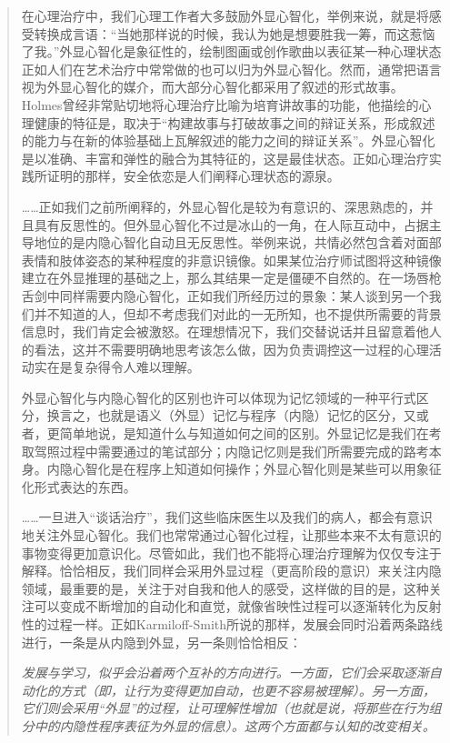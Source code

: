 \blockquote{
在心理治疗中，我们心理工作者大多鼓励外显心智化，举例来说，就是将感受转换成言语：“当她那样说的时候，我认为她是想要胜我一筹，而这惹恼了我。”外显心智化是象征性的，绘制图画或创作歌曲以表征某一种心理状态\pozhehao{}正如人们在艺术治疗中常常做的\pozhehao{}也可以归为外显心智化。然而，通常把语言视为外显心智化的媒介，而大部分心智化都采用了叙述的形式\pozhehao{}故事。Holmes曾经非常贴切地将心理治疗比喻为培育讲故事的功能，他描绘的心理健康的特征是，取决于“构建故事与打破故事之间的辩证关系，形成叙述的能力与在新的体验基础上瓦解叙述的能力之间的辩证关系”。外显心智化是以准确、丰富和弹性的融合为其特征的，这是最佳状态。正如心理治疗实践所证明的那样，安全依恋是人们阐释心理状态的源泉。

……正如我们之前所阐释的，外显心智化是较为有意识的、深思熟虑的，并且具有反思性的。但外显心智化不过是冰山的一角，在人际互动中，占据主导地位的是内隐心智化\pozhehao{}自动且无反思性。举例来说，共情必然包含着对面部表情和肢体姿态的某种程度的非意识镜像。如果某位治疗师试图将这种镜像建立在外显推理的基础之上，那么其结果一定是僵硬不自然的。在一场唇枪舌剑中同样需要内隐心智化，正如我们所经历过的景象：某人谈到另一个我们并不知道的人，但却不考虑我们对此的一无所知，也不提供所需要的背景信息时，我们肯定会被激怒。在理想情况下，我们交替说话并且留意着他人的看法，这并不需要明确地思考该怎么做，因为负责调控这一过程的心理活动实在是复杂得令人难以理解。

外显心智化与内隐心智化的区别也许可以体现为记忆领域的一种平行式区分，换言之，也就是语义（外显）记忆与程序（内隐）记忆的区分，又或者，更简单地说，是知道什么与知道如何之间的区别。外显记忆是我们在考取驾照过程中需要通过的笔试部分；内隐记忆则是我们所需要完成的路考本身。内隐心智化是在程序上知道如何操作；外显心智化则是某些可以用象征化形式表达的东西。

……一旦进入“谈话治疗”，我们这些临床医生以及我们的病人，都会有意识地关注外显心智化。我们也常常通过心智化过程，让那些本来不太有意识的事物变得更加意识化。尽管如此，我们也不能将心理治疗理解为仅仅专注于解释。恰恰相反，我们同样会采用外显过程（更高阶段的意识）来关注内隐领域，最重要的是，关注于对自我和他人的感受，这样做的目的是，这种关注可以变成不断增加的自动化和直觉，就像省映性过程可以逐渐转化为反射性的过程一样。正如Karmiloff-Smith所说的那样，发展会同时沿着两条路线进行，一条是从内隐到外显，另一条则恰恰相反：

\itshape 发展与学习，似乎会沿着两个互补的方向进行。一方面，它们会采取逐渐自动化的方式（即，让行为变得更加自动，也更不容易被理解）。另一方面，它们则会采用“外显”的过程，让可理解性增加（也就是说，将那些在行为组分中的内隐性程序表征为外显的信息）。这两个方面都与认知的改变相关。
}

